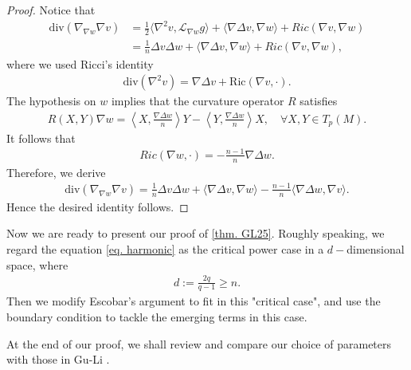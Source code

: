 \documentclass[12pt]{amsart}
\numberwithin{equation}{section}
\numberwithin{lemma}{section}
\numberwithin{proposition}{section}
\numberwithin{corollary}{section}
\numberwithin{remark}{section}
\begin{document}
\begin{proof}
    Notice that
    \begin{align*}
        \mathrm{div}(\nabla_{\nabla w}\nabla v)
        &=\frac{1}{2}\langle \nabla^2 v,\mathcal{L}_{\nabla w}g\rangle
        +\langle\nabla\Delta v,\nabla w\rangle
        +Ric(\nabla v,\nabla w)\\
        &=\frac{1}{n}\Delta v\Delta w
        +\langle\nabla\Delta v,\nabla w\rangle
        +Ric(\nabla v,\nabla w),
    \end{align*}
    where we used Ricci's identity
    \begin{align*}
        \mathrm{div}(\nabla^2 v)=\nabla \Delta v+\mathrm{Ric}(\nabla v,\cdot).
    \end{align*}
    The hypothesis on $w$ implies that the curvature operator $R$ satisfies
    \begin{align*}
        R(X,Y)\nabla w=\left\langle X, \frac{\nabla \Delta w}{n}\right\rangle Y
        -\left\langle Y, \frac{\nabla \Delta w}{n}\right\rangle X,\quad \forall X,Y\in T_p(M).
    \end{align*}
    It follows that 
    \begin{align*}
        Ric(\nabla w,\cdot)=-\frac{n-1}{n}\nabla \Delta w.
    \end{align*}
    Therefore, we derive
    \begin{align*}
        \mathrm{div}(\nabla_{\nabla w}\nabla v)
        =\frac{1}{n}\Delta v\Delta w
        +\langle\nabla\Delta v,\nabla w\rangle
        -\frac{n-1}{n}\langle\nabla \Delta w,\nabla v\rangle.
    \end{align*}
    Hence the desired identity follows.
\end{proof}
Now we are ready to present our proof of \cref{thm. GL25}.
Roughly speaking, we regard the equation \cref{eq. harmonic} as the  critical power case in a $d-$dimensional space, where \begin{align}\label{eq. intrinsic dimension}
    d:=\frac{2q}{q-1}\geq n.
\end{align}
Then we modify Escobar's argument \cite{Esc90} to fit in this "critical case", and use the boundary condition to tackle the emerging terms in this case.

At the end of our proof, we shall review and compare our choice of parameters with those in Gu-Li \cite{GL25}.
\end{document}
